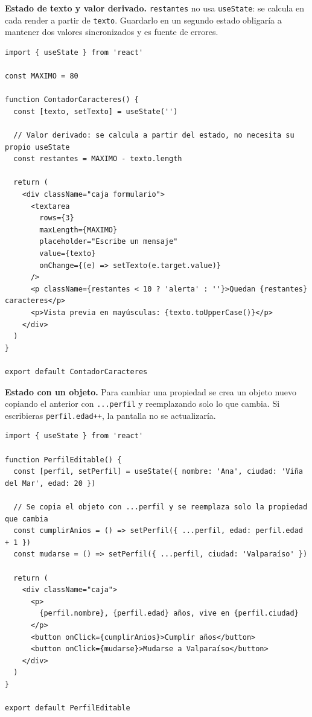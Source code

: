 \documentclass[11pt,a4paper]{article}
\newcommand{\cmd}[1]{\texttt{\color{reactdark}#1}}
\begin{document}
\textbf{Estado de texto y valor derivado.} \cmd{restantes} no usa \cmd{useState}: se calcula en cada render a partir de \cmd{texto}. Guardarlo en un segundo estado obligaría a mantener dos valores sincronizados y es fuente de errores.

\begin{lstlisting}[language=JSX,title={\small\ttfamily src/components/estado/ContadorCaracteres.jsx}]
import { useState } from 'react'

const MAXIMO = 80

function ContadorCaracteres() {
  const [texto, setTexto] = useState('')

  // Valor derivado: se calcula a partir del estado, no necesita su propio useState
  const restantes = MAXIMO - texto.length

  return (
    <div className="caja formulario">
      <textarea
        rows={3}
        maxLength={MAXIMO}
        placeholder="Escribe un mensaje"
        value={texto}
        onChange={(e) => setTexto(e.target.value)}
      />
      <p className={restantes < 10 ? 'alerta' : ''}>Quedan {restantes} caracteres</p>
      <p>Vista previa en mayúsculas: {texto.toUpperCase()}</p>
    </div>
  )
}

export default ContadorCaracteres
\end{lstlisting}

\textbf{Estado con un objeto.} Para cambiar una propiedad se crea un objeto nuevo copiando el anterior con \cmd{...perfil} y reemplazando solo lo que cambia. Si escribieras \cmd{perfil.edad++}, la pantalla no se actualizaría.

\begin{lstlisting}[language=JSX,title={\small\ttfamily src/components/estado/PerfilEditable.jsx}]
import { useState } from 'react'

function PerfilEditable() {
  const [perfil, setPerfil] = useState({ nombre: 'Ana', ciudad: 'Viña del Mar', edad: 20 })

  // Se copia el objeto con ...perfil y se reemplaza solo la propiedad que cambia
  const cumplirAnios = () => setPerfil({ ...perfil, edad: perfil.edad + 1 })
  const mudarse = () => setPerfil({ ...perfil, ciudad: 'Valparaíso' })

  return (
    <div className="caja">
      <p>
        {perfil.nombre}, {perfil.edad} años, vive en {perfil.ciudad}
      </p>
      <button onClick={cumplirAnios}>Cumplir años</button>
      <button onClick={mudarse}>Mudarse a Valparaíso</button>
    </div>
  )
}

export default PerfilEditable
\end{lstlisting}
\end{document}
